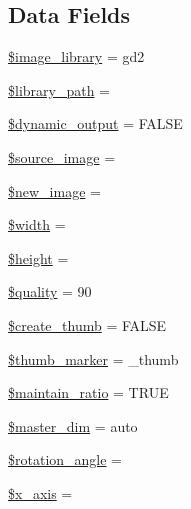 \subsection*{Data Fields}
\begin{DoxyCompactItemize}
\item 
\hyperlink{class_c_i___image__lib_ac4b224358e1169eec8db344bcb3186c0}{\$image\+\_\+library} = \textquotesingle{}gd2\textquotesingle{}
\item 
\hyperlink{class_c_i___image__lib_ac09f7fc802884aae2149f1df0e53f17a}{\$library\+\_\+path} = \textquotesingle{}\textquotesingle{}
\item 
\hyperlink{class_c_i___image__lib_ad90737913d82776e7d3a7dfaef68e167}{\$dynamic\+\_\+output} = F\+A\+L\+SE
\item 
\hyperlink{class_c_i___image__lib_a54fc395722d5e9f15d656d22ba84e382}{\$source\+\_\+image} = \textquotesingle{}\textquotesingle{}
\item 
\hyperlink{class_c_i___image__lib_a6147ac30032312f2b42a9b05618faf12}{\$new\+\_\+image} = \textquotesingle{}\textquotesingle{}
\item 
\hyperlink{class_c_i___image__lib_a5795120b4b324bc4ca83f1e6fdce7d57}{\$width} = \textquotesingle{}\textquotesingle{}
\item 
\hyperlink{class_c_i___image__lib_a2c265bba1724371bb03e6901297c30b2}{\$height} = \textquotesingle{}\textquotesingle{}
\item 
\hyperlink{class_c_i___image__lib_a0e342ea32cccdc2c932ad23b9796a62a}{\$quality} = \textquotesingle{}90\textquotesingle{}
\item 
\hyperlink{class_c_i___image__lib_ab1250903cbadaaadb42ec188d38ab398}{\$create\+\_\+thumb} = F\+A\+L\+SE
\item 
\hyperlink{class_c_i___image__lib_a3176700c651c0c3cd8cfa186ba03302a}{\$thumb\+\_\+marker} = \textquotesingle{}\+\_\+thumb\textquotesingle{}
\item 
\hyperlink{class_c_i___image__lib_a7fe1beb3e7d60245c97c60ee4b668d93}{\$maintain\+\_\+ratio} = T\+R\+UE
\item 
\hyperlink{class_c_i___image__lib_ae86c3d7ce316cc0c48a8dcba8ae4130d}{\$master\+\_\+dim} = \textquotesingle{}auto\textquotesingle{}
\item 
\hyperlink{class_c_i___image__lib_a9410d2e216c0c1dd852031f2a39e7ec7}{\$rotation\+\_\+angle} = \textquotesingle{}\textquotesingle{}
\item 
\hyperlink{class_c_i___image__lib_a128914b11765a500690f876962196ca6}{\$x\+\_\+axis} = \textquotesingle{}\textquotesingle{}

\end{DoxyCompactItemize}
